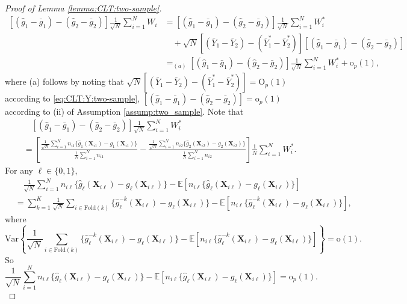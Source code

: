 \documentclass[12pt,letterpaper]{article}
\begin{document}
\begin{proof}[Proof of Lemma \ref{lemma:CLT:two-sample}]
\begin{equation}
\begin{array}{rl}
\displaystyle[(\hat{g}_1-\bar{g}_1)-(\hat{g}_2-\bar{g}_2)]\frac{1}{\sqrt{N}}\sum_{i=1}^NW_i\!\!\!\!&\displaystyle=[(\hat{g}_1-\bar{g}_1)-(\hat{g}_2-\bar{g}_2)]\frac{1}{\sqrt{N}}\sum_{i=1}^NW_i^*\\
&\quad\displaystyle+\sqrt{N}\left[(\bar{Y}_1-\bar{Y}_2)-(\bar{Y}_1^*-\bar{Y}_2^*)\right][(\hat{g}_1-\bar{g}_1)-(\hat{g}_2-\bar{g}_2)]\\
&\displaystyle=_{(a)}[(\hat{g}_1-\bar{g}_1)-(\hat{g}_2-\bar{g}_2)]\frac{1}{\sqrt{N}}\sum_{i=1}^NW_i^*+\mathrm{o}_p(1),
\end{array}
\end{equation}
where (a) follows by noting that $\sqrt{N}\left[(\bar{Y}_1-\bar{Y}_2)-(\bar{Y}_1^*-\bar{Y}_2^*)\right]=\mathrm{O}_p(1)$ according to \eqref{eq:CLT:Y:two-sample}, $\left[(\hat{g}_1-\bar{g}_1)-(\hat{g}_2-\bar{g}_2)\right]=\mathrm{o}_p(1)$ according to (ii) of Assumption \ref{assump:two_sample}. Note that 
$$\begin{array}{rl}
&\displaystyle\quad\left[(\hat{g}_1-\bar{g}_1)-(\hat{g}_2-\bar{g}_2)\right]\frac{1}{\sqrt{N}}\sum_{i=1}^NW_i^*\\
&\displaystyle=\left[\frac{\frac{1}{\sqrt{N}}\sum_{i=1}^Nn_{i1}\{\hat{g}_{1}(\mathbf{X}_{i1})-g_{1}(\mathbf{X}_{i1})\}}{\frac{1}{N}\sum_{i=1}^Nn_{i1}}-\frac{\frac{1}{\sqrt{N}}\sum_{i=1}^Nn_{i2}\{\hat{g}_{2}(\mathbf{X}_{i2})-g_{2}(\mathbf{X}_{i2})\}}{\frac{1}{N}\sum_{i=1}^Nn_{i2}}\right]\frac{1}{N}\sum_{i=1}^NW_i^*.
\end{array}$$
For any $\ell\in\{0,1\}$,
$$\begin{array}{rl}
&\displaystyle\quad\frac{1}{\sqrt{N}}\sum_{i=1}^Nn_{i\ell}\{\hat{g}_{\ell}(\mathbf{X}_{i\ell})-g_{\ell}(\mathbf{X}_{i\ell})\}-\mathbb{E}\left[n_{i\ell}\{\hat{g}_{\ell}(\mathbf{X}_{i\ell})-g_{\ell}(\mathbf{X}_{i\ell})\}\right]\\
&\displaystyle=\sum_{k=1}^K\frac{1}{\sqrt{N}}\sum_{i\in\textrm{Fold}(k)}\{\hat{g}_{\ell}^{-k}(\mathbf{X}_{i\ell})-g_{\ell}(\mathbf{X}_{i\ell})\}-\mathbb{E}\left[n_{i\ell}\{\hat{g}_{\ell}^{-k}(\mathbf{X}_{i\ell})-g_{\ell}(\mathbf{X}_{i\ell})\}\right],
\end{array}$$
where 
$$\mathrm{Var}\left\{\frac{1}{\sqrt{N}}\sum_{i\in\textrm{Fold}(k)}\{\hat{g}_{\ell}^{-k}(\mathbf{X}_{i\ell})-g_{\ell}(\mathbf{X}_{i\ell})\}-\mathbb{E}\left[n_{i\ell}\{\hat{g}_{\ell}^{-k}(\mathbf{X}_{i\ell})-g_{\ell}(\mathbf{X}_{i\ell})\}\right]\right\}=\mathrm{o}(1).$$
So
\begin{equation}\label{eq:n:g:vanish}
    \frac{1}{\sqrt{N}}\sum_{i=1}^Nn_{i\ell}\{\hat{g}_{\ell}(\mathbf{X}_{i\ell})-g_{\ell}(\mathbf{X}_{i\ell})\}-\mathbb{E}\left[n_{i\ell}\{\hat{g}_{\ell}(\mathbf{X}_{i\ell})-g_{\ell}(\mathbf{X}_{i\ell})\}\right]=\mathrm{o}_p(1).

\end{equation}
\end{proof}
\end{document}
